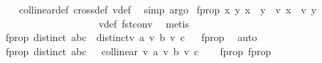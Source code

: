 \begin{isabellebody}
%
\isadelimproof
\ \ %
\endisadelimproof
%
\isatagproof
{}\isamarkupfalse%
\ collinear{}{\isacharunderscore}{\kern0pt}def\ cross{}{\isacharunderscore}{\kern0pt}def\ v{}{\isacharunderscore}{\kern0pt}def\ \isamarkupfalse%
\ {\isacharparenleft}{\kern0pt}simp{\isacharcomma}{\kern0pt}\ argo{\isacharparenright}{\kern0pt}%
\endisatagproof
{\isafoldproof}%
%
\isadelimproof
\isanewline
%
\endisadelimproof
{}\isamarkupfalse%
\ f{\isacharunderscore}{\kern0pt}prop{}{\isacharcolon}{\kern0pt}\ {\isachardoublequoteopen}{\isasymforall}x\ y{\isachardot}{\kern0pt}\ x\ {\isasymnoteq}\ y\ {\isasymlongleftrightarrow}\ v{}\ x\ {\isasymnoteq}\ v{}\ y{\isachardoublequoteclose}%
\isadelimproof
\ \ \ \ \ \ \ \ \ \ \ \ \ \ \ \ \ \ %
\endisadelimproof
%
\isatagproof
{}\isamarkupfalse%
\ v{}{\isacharunderscore}{\kern0pt}def\ fst{\isacharunderscore}{\kern0pt}conv\ \isamarkupfalse%
\ metis%
\endisatagproof
{\isafoldproof}%
%
\isadelimproof
%
\endisadelimproof
\isanewline
{}\isamarkupfalse%
\ f{\isacharunderscore}{\kern0pt}prop{}{\isacharcolon}{\kern0pt}\ {\isachardoublequoteopen}distinct\ {\isacharbrackleft}{\kern0pt}a{\isacharcomma}{\kern0pt}b{\isacharcomma}{\kern0pt}c{\isacharbrackright}{\kern0pt}\ {\isasymlongrightarrow}\ distinct{\isacharbrackleft}{\kern0pt}v{}\ a{\isacharcomma}{\kern0pt}\ v{}\ b{\isacharcomma}{\kern0pt}\ v{}\ c{\isacharbrackright}{\kern0pt}{\isachardoublequoteclose}%
\isadelimproof
\ %
\endisadelimproof
%
\isatagproof
{}\isamarkupfalse%
\ f{\isacharunderscore}{\kern0pt}prop{}\ \isamarkupfalse%
\ auto%
\endisatagproof
{\isafoldproof}%
%
\isadelimproof
%
\endisadelimproof
\isanewline
{}\isamarkupfalse%
\ f{\isacharunderscore}{\kern0pt}prop{}{\isacharcolon}{\kern0pt}\ {\isachardoublequoteopen}distinct\ {\isacharbrackleft}{\kern0pt}a{\isacharcomma}{\kern0pt}b{\isacharcomma}{\kern0pt}c{\isacharbrackright}{\kern0pt}\ {\isasymlongrightarrow}\ {\isasymnot}\ collinear{}\ {\isacharparenleft}{\kern0pt}v{}\ a{\isacharparenright}{\kern0pt}\ {\isacharparenleft}{\kern0pt}v{}\ b{\isacharparenright}{\kern0pt}\ {\isacharparenleft}{\kern0pt}v{}\ c{\isacharparenright}{\kern0pt}{\isachardoublequoteclose}\isanewline
%
\isadelimproof
\ \ %
\endisadelimproof
%
\isatagproof
{}\isamarkupfalse%
\ f{\isacharunderscore}{\kern0pt}prop{}\ f{\isacharunderscore}{\kern0pt}prop{}\ \isamarkupfalse%

\end{isabellebody}
